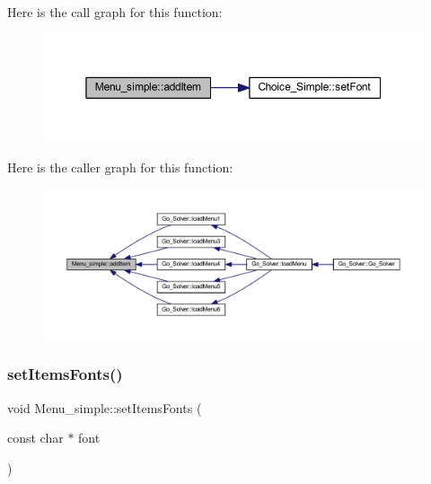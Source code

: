 Here is the call graph for this function\+:
\nopagebreak
\begin{figure}[H]
\begin{center}
\leavevmode
\includegraphics[width=350pt]{class_menu__simple_a0fc5b4ec10c844f34495364f70cd333e_cgraph}
\end{center}
\end{figure}
Here is the caller graph for this function\+:
\nopagebreak
\begin{figure}[H]
\begin{center}
\leavevmode
\includegraphics[width=350pt]{class_menu__simple_a0fc5b4ec10c844f34495364f70cd333e_icgraph}
\end{center}
\end{figure}
\mbox{\label{class_menu__simple_a1273e6743ee892cd8651968efd595b73}} 
\subsubsection{\texorpdfstring{set\+Items\+Fonts()}{setItemsFonts()}}
{\footnotesize\ttfamily void Menu\+\_\+simple\+::set\+Items\+Fonts (\begin{DoxyParamCaption}\item[{const char $\ast$}]{font }\end{DoxyParamCaption})\hspace{0.3cm}{\ttfamily [virtual]}}

